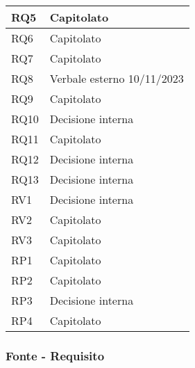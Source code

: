 \begin{center}
\begin{longtable}{|C{5cm}|C{5cm}|}
        \hline
        RQ5 & Capitolato \\
        \hline
        RQ6 & Capitolato \\
        \hline
        RQ7 & Capitolato \\
        \hline
        RQ8 & Verbale esterno 10/11/2023 \\
        \hline
        RQ9 & Capitolato \\
        \hline
        RQ10 & Decisione interna \\
        \hline
        RQ11 & Capitolato \\
        \hline
        RQ12 & Decisione interna \\
        \hline
        RQ13 & Decisione interna \\
        \hline
        \hline
        RV1 & Decisione interna \\
        \hline
        RV2 & Capitolato \\
        \hline
        RV3 & Capitolato \\
        \hline
        \hline
        RP1 & Capitolato \\
        \hline
        RP2 & Capitolato \\
        \hline
        RP3 & Decisione interna \\
        \hline
        RP4 & Capitolato \\
        \hline
    \end{longtable}
\end{center}

\subsubsection{Fonte - Requisito}

